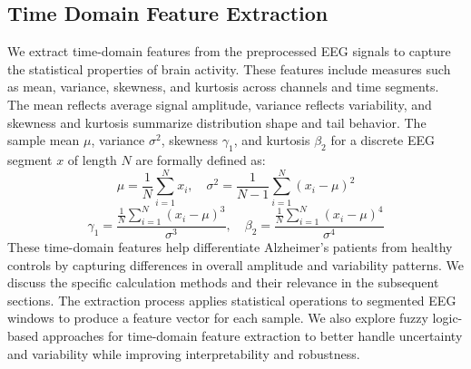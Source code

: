 \documentclass[openany]{book}
\begin{document}
\subsection{Time Domain Feature Extraction}
\label{subsec:time_domain}
We extract time-domain features from the preprocessed EEG signals to capture the statistical properties of brain activity. These features include measures such as mean, variance, skewness, and kurtosis across channels and time segments. The mean reflects average signal amplitude, variance reflects variability, and skewness and kurtosis summarize distribution shape and tail behavior. The sample mean $\mu$, variance $\sigma^2$, skewness $\gamma_1$, and kurtosis $\beta_2$ for a discrete EEG segment $x$ of length $N$ are formally defined as:
\begin{equation}
    \mu = \frac{1}{N} \sum_{i=1}^{N} x_i, \quad 
    \sigma^2 = \frac{1}{N-1} \sum_{i=1}^{N} (x_i - \mu)^2
\end{equation}
\begin{equation}
    \gamma_1 = \frac{\frac{1}{N} \sum_{i=1}^{N} (x_i - \mu)^3}{\sigma^3}, \quad 
    \beta_2 = \frac{\frac{1}{N} \sum_{i=1}^{N} (x_i - \mu)^4}{\sigma^4}
\end{equation}
These time-domain features help differentiate Alzheimer's patients from healthy controls by capturing differences in overall amplitude and variability patterns. We discuss the specific calculation methods and their relevance in the subsequent sections. The extraction process applies statistical operations to segmented EEG windows to produce a feature vector for each sample. We also explore fuzzy logic-based approaches for time-domain feature extraction to better handle uncertainty and variability while improving interpretability and robustness.
\end{document}
